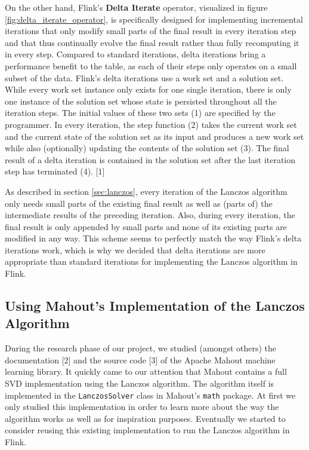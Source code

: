 On the other hand, Flink's \textbf{Delta Iterate} operator, visualized in
figure \ref{fig:delta_iterate_operator}, is specifically designed for
implementing incremental iterations that only modify small parts of the final
result in every iteration step and that thus continually evolve the final
result rather than fully recomputing it in every step. Compared to standard
iterations, delta iterations bring a performance benefit to the table, as each
of their steps only operates on a small subset of the data. Flink's delta
iterations use a work set and a solution set. While every work set instance
only exists for one single iteration, there is only one instance of the
solution set whose state is persisted throughout all the iteration steps. The
initial values of these two sets (1) are specified by the programmer. In every
iteration, the step function (2) takes the current work set and the current
state of the solution set as its input and produces a new work set while also
(optionally) updating the contents of the solution set (3). The final result of
a delta iteration is contained in the solution set after the last iteration
step has terminated (4). [1]


As described in section \ref{sec:lanczos}, every iteration of the Lanczos
algorithm only needs small parts of the existing final result as well as (parts
of) the intermediate results of the preceding iteration. Also, during every
iteration, the final result is only appended by small parts and none of its
existing parts are modified in any way. This scheme seems to perfectly match
the way Flink's delta iterations work, which is why we decided that delta
iterations are more appropriate than standard iterations for implementing the
Lanczos algorithm in Flink.



\subsection{Using Mahout's Implementation of the Lanczos Algorithm}

During the research phase of our project, we studied (amongst others) the
documentation [2] and the source code [3] of the Apache Mahout machine learning
library. It quickly came to our attention that Mahout contains a full SVD
implementation using the Lanczos algorithm. The algorithm itself is implemented
in the \texttt{LanczosSolver} class in Mahout's \texttt{math} package. At first
we only studied this implementation in order to learn more about the way the
algorithm works as well as for inspiration purposes. Eventually we started to
consider reusing this existing implementation to run the Lanczos algorithm in
Flink.

